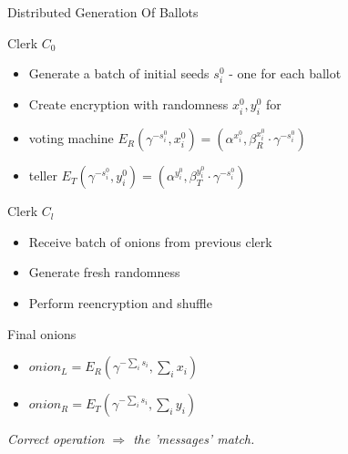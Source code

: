 \documentclass{beamer}
\begin{document}
\begin{frame}[allowframebreaks]{Distributed Generation Of Ballots}
\begin{block}{Clerk $C_0$}

\begin{itemize}
\item Generate a batch of initial seeds $s_i^0$ - one for each ballot
\item Create encryption with randomness $x_i^0,y_i^0$ for 
 
\item voting machine $E_{R}(\gamma^{ - s_i^0},x_i^0)=(\alpha^{x_i^0},\beta_R^{x_i^0} \cdot \gamma^{ - s_i^0})  $ 
\item teller $E_{T}(\gamma^{ - s_i^0},y_i^0)=(\alpha^{y_i^0},\beta_T^{y_i^0} \cdot \gamma^{ - s_i^0})$  
 
\end{itemize}
\end{block}

\begin{block}{Clerk $C_l$}
\begin{itemize}
\item Receive batch of onions from previous clerk
\item Generate fresh randomness 
\item Perform reencryption and shuffle
\end{itemize}
\end{block}

\begin{block}{Final onions}
\begin{itemize}
\item $onion_L=E_{R}(\gamma^{ - \sum_i s_i},\sum_i x_i)$
\item $onion_R=E_{T}(\gamma^{ - \sum_i s_i},\sum_i y_i)$ 
\end{itemize}
\end{block}
\begin{center}
\begin{center}
\emph{Correct operation $\Rightarrow$ the 'messages' match.}
\end{center}
\end{center}
\end{frame}
\end{document}
